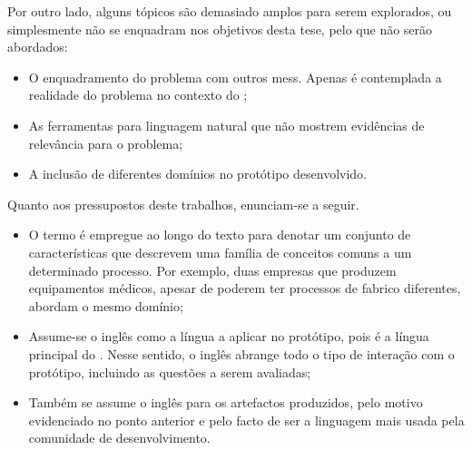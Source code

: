 Por outro lado, alguns tópicos são demasiado amplos para serem explorados, ou simplesmente não se enquadram nos objetivos desta tese, pelo que não serão abordados:

\begin{itemize}
    \item
    {
        O enquadramento do problema com outros \glspl{mes}. Apenas é contemplada a realidade do problema no contexto do {\productname};
    }
    \item
    {
        As ferramentas para linguagem natural que não mostrem evidências de relevância para o problema;
    }
    \item 
    {
        A inclusão de diferentes domínios no protótipo desenvolvido.
    }
\end{itemize}

Quanto aos pressupostos deste trabalhos, enunciam-se a seguir.

\begin{itemize}
    \item 
    {
        O termo  é empregue ao longo do texto para denotar um conjunto de características que descrevem uma família de conceitos comuns a um determinado processo. Por exemplo, duas empresas que produzem equipamentos médicos, apesar de poderem ter processos de fabrico diferentes, abordam o mesmo domínio;
    }
    \item
    {
        Assume-se o inglês como a língua a aplicar no protótipo, pois é a língua principal do {\productname}. Nesse sentido, o inglês abrange todo o tipo de interação com o protótipo, incluindo as questões a serem avaliadas;
    }
    \item
    {
        Também se assume o inglês para os artefactos produzidos, pelo motivo evidenciado no ponto anterior e pelo facto de ser a linguagem mais usada pela comunidade de desenvolvimento.
    }
\end{itemize}


